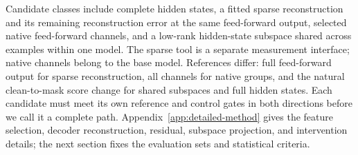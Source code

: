 Candidate classes include complete hidden states, a fitted sparse reconstruction and its remaining reconstruction error at the same feed-forward output, selected native feed-forward channels, and a low-rank hidden-state subspace shared across examples within one model. The sparse tool is a separate measurement interface; native channels belong to the base model. References differ: full feed-forward output for sparse reconstruction, all channels for native groups, and the natural clean-to-mask score change for shared subspaces and full hidden states. Each candidate must meet its own reference and control gates in both directions before we call it a complete path. Appendix~\ref{app:detailed-method} gives the feature selection, decoder reconstruction, residual, subspace projection, and intervention details; the next section fixes the evaluation sets and statistical criteria.
